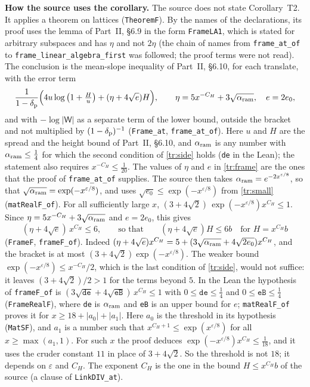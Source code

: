 \documentclass[11pt,letterpaper]{article}
\begin{document}
\textbf{How the source uses the corollary.} The source does not state Corollary~T2. It applies a theorem on
lattices (\texttt{TheoremF}). By the names of the declarations, its
proof uses the lemma of Part~II, \S6.9 in the form \texttt{FrameLA1}, which is stated for arbitrary
subspaces and has $\eta$ and not $2\eta$ (the
chain of names from \texttt{frame\_at\_of} to \texttt{frame\_linear\_algebra\_first} was followed; the proof
terms were not read). The conclusion is the mean-slope inequality of Part~II, \S6.10, for each translate,
with the error term
\begin{equation}\label{tr:frame}
 \frac1{1-\delta_{\rm p}}\Big(4u\log\big(1+\tfrac Hu\big)+(\eta+4\sqrt e)H\Big),\qquad
 \eta=5x^{-C_H}+3\sqrt{\alpha_{\rm ram}},\quad e=2e_0,
\end{equation}
and with $-\log|\mathsf W|$ as a separate term of the lower bound, outside the bracket and not multiplied
by $(1-\delta_{\rm p})^{-1}$ (\texttt{Frame\_at}, \texttt{frame\_at\_of}). Here $u$ and $H$ are the
spread and the height bound of Part~II, \S6.10, and $\alpha_{\rm ram}$ is any number with $\alpha_{\rm ram}\le\frac14$ for which the
second condition of \eqref{tr:side} holds (\texttt{de} in the Lean); the statement also requires $x^{-C_H}\le\frac1{20}$. The values of $\eta$ and $e$ in
\eqref{tr:frame} are the ones that the proof of \texttt{frame\_at\_of} supplies. The source then takes
$\alpha_{\rm ram}=e^{-2x^{\varepsilon/8}}$, so that $\sqrt{\alpha_{\rm ram}}=\exp(-x^{\varepsilon/8})$, and uses
$\sqrt{e_0}\le \exp(-x^{\varepsilon/8})$ from \eqref{tr:small} (\texttt{matRealF\_of}). For all sufficiently
large $x$, $(3+4\sqrt2)\,\exp(-x^{\varepsilon/8})x^{C_H}\le1$. Since $\eta=5x^{-C_H}+3\sqrt{\alpha_{\rm ram}}$ and $e=2e_0$,
this gives
\begin{equation}\label{tr:six}
 (\eta+4\sqrt e)\,x^{C_H}\le6,\qquad\text{so that}\qquad(\eta+4\sqrt e)H\le6b\quad\text{for }H=x^{C_H}b
\end{equation}
(\texttt{FrameF}, \texttt{frameF\_of}). Indeed $(\eta+4\sqrt e)x^{C_H}=5+(3\sqrt{\alpha_{\rm ram}}+4\sqrt{2e_0})x^{C_H}$, and
the bracket is at most $(3+4\sqrt2)\exp(-x^{\varepsilon/8})$. The weaker bound
$\exp(-x^{\varepsilon/8})\le x^{-C_H}/2$, which is the last condition of \eqref{tr:side}, would not suffice: it
leaves $(3+4\sqrt2)/2>1$ for the terms beyond $5$. In the Lean the hypothesis of \texttt{frameF\_of} is
$(3\sqrt{\texttt{de}}+4\sqrt{\texttt{eB}})\,x^{C_H}\le1$ with $0\le\texttt{de}\le\frac14$ and
$0\le\texttt{eB}\le\frac14$ (\texttt{FrameRealF}), where \texttt{de} is $\alpha_{\rm ram}$ and \texttt{eB} is an upper
bound for $e$; \texttt{matRealF\_of} proves it for $x\ge18+|a_0|+|a_1|$. Here $a_0$ is the threshold in its
hypothesis (\texttt{MatSF}), and $a_1$ is a number such that $x^{C_H+1}\le\exp(x^{\varepsilon/8})$ for all
$x\ge\max(a_1,1)$. For such $x$ the proof deduces $\exp(-x^{\varepsilon/8})x^{C_H}\le\frac1{18}$, and it
uses the cruder constant $11$ in place of $3+4\sqrt2$. So the threshold is not $18$; it depends on
$\varepsilon$ and $C_H$. The exponent $C_H$ is the one in the bound
$H\le x^{C_H}b$ of the source (a clause of \texttt{LinkDIV\_at}).
\end{document}
